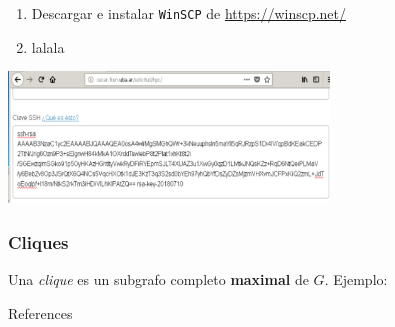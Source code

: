 \documentclass[]{beamer}
\begin{document}
\begin{frame}
\begin{enumerate}
  \item Descargar e instalar \Verb=WinSCP= de \url{https://winscp.net/}
  \item lalala
\end{enumerate}
\begin{center}
  \includegraphics[width=23em]{./ssh-web-cecar}
  \end{center} 
\end{frame}



\begin{frame}
\frametitle{Cliques}
 \begin{definition}[Clique]
 Una \emph{clique} es un subgrafo completo \textbf{maximal} de $G$. Ejemplo:
 \end{definition}
\end{frame}

\begin{frame}[allowframebreaks]{References}
\def\newblock{}
% 
% 
\end{frame}
\end{document}
